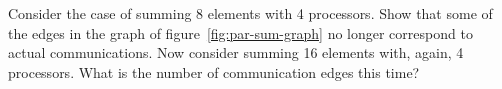   Consider the case of summing 8 elements with 4 processors. Show that
  some of the edges in the graph of figure~\ref{fig:par-sum-graph} no
  longer correspond to actual communications.
  Now consider summing 16 elements with, again, 4 processors. What is
  the number of communication edges this time?
